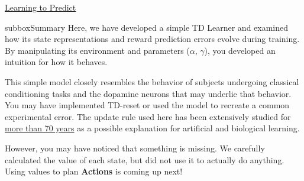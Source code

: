 \begin{textbox}{\href{https://compneuro.neuromatch.io/tutorials/W3D4_ReinforcementLearning/student/W3D4_Tutorial1.html}{Learning to Predict } }
\begin{subbox}{subbox}{Summary}
\scriptsize
Here, we have developed a simple TD Learner and examined how its state representations and reward prediction errors evolve during training. By manipulating its environment and parameters ($\alpha$, $\gamma$), you developed an intuition for how it behaves. 

This simple model closely resembles the behavior of subjects undergoing classical conditioning tasks and the dopamine neurons that may underlie that behavior. You may have implemented TD-reset or used the model to recreate a common experimental error. The update rule used here has been extensively studied for \href{https://www.pnas.org/content/108/Supplement_3/15647}{more than 70 years} as a possible explanation for artificial and biological learning. 

However, you may have noticed that something is missing. We carefully calculated the value of each state, but did not use it to actually do anything. Using values to plan \textbf{Actions} is coming up next!

\end{subbox}
\end{textbox}
\newpage

